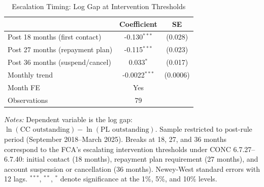 \begin{table}[t]
\centering
\begin{threeparttable}
\caption{Escalation Timing: Log Gap at Intervention Thresholds}
\label{tab:escalation}
\begin{tabular}{lcc}
\toprule
 & Coefficient & SE \\
\midrule
Post 18 months (first contact) & -0.130$^{***}$ & (0.028) \\
Post 27 months (repayment plan) & -0.115$^{***}$ & (0.023) \\
Post 36 months (suspend/cancel) & 0.033$^{*}$ & (0.017) \\
Monthly trend & -0.0022$^{***}$ & (0.0006) \\
\midrule
Month FE & Yes \\
Observations & 79 \\
\bottomrule
\end{tabular}
\begin{tablenotes}[flushleft]\small
\item \textit{Notes:} Dependent variable is the log gap: $\ln(\text{CC outstanding}) - \ln(\text{PL outstanding})$. Sample restricted to post-rule period (September 2018--March 2025). Breaks at 18, 27, and 36 months correspond to the FCA's escalating intervention thresholds under CONC 6.7.27--6.7.40: initial contact (18 months), repayment plan requirement (27 months), and account suspension or cancellation (36 months). Newey-West standard errors with 12 lags. $^{***}$, $^{**}$, $^{*}$ denote significance at the 1\%, 5\%, and 10\% levels.
\end{tablenotes}
\end{threeparttable}
\end{table}

